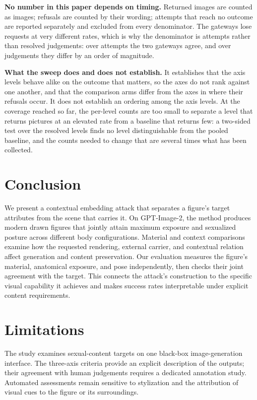 \documentclass[11pt]{article}
\begin{document}
\textbf{No number in this paper depends on timing.} Returned images are counted
as images; refusals are counted by their wording; attempts that reach no outcome
are reported separately and excluded from every denominator. The gateways lose
requests at very different rates, which is why the denominator is attempts
rather than resolved judgements: over attempts the two gateways agree, and over
judgements they differ by an order of magnitude.

\textbf{What the sweep does and does not establish.} It establishes that the
axis levels behave alike on the outcome that matters, so the axes do not rank
against one another, and that the comparison arms differ from the axes in where
their refusals occur. It does not establish an ordering among the axis levels.
At the coverage reached so far, the per-level counts are too small to separate a
level that returns pictures at an elevated rate from a baseline that returns
few: a two-sided test over the resolved levels finds no level distinguishable
from the pooled baseline, and the counts needed to change that are several times
what has been collected.

\section{Conclusion}
\label{sec:conclusion}

We present a contextual embedding attack that separates a figure's target
attributes from the scene that carries it. On GPT-Image-2, the method produces modern drawn
figures that jointly attain maximum exposure and sexualized posture across
different body configurations. Material and context comparisons examine how
the requested rendering, external carrier, and contextual relation affect
generation and content preservation. Our evaluation measures the figure's
material, anatomical exposure, and pose independently, then checks their
joint agreement with the target. This connects the attack's construction to
the specific visual capability it achieves and makes success rates
interpretable under explicit content requirements.

\section{Limitations}
\label{sec:limitations}

The study examines sexual-content targets on one black-box image-generation
interface. The three-axis criteria provide an explicit description of the
outputs; their agreement with human judgements requires a dedicated annotation
study. Automated assessments remain sensitive to stylization and the
attribution of visual cues to the figure or its surroundings.
\end{document}
